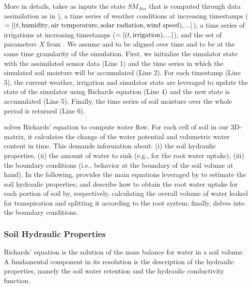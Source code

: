 More in details, \olab{} takes as inputs the state $SM_{Ass}$ that is computed through data assimilation as in ), a time series of weather conditions at increasing timestamps (\Wt$=[(t, \textup{humidity}, \textup{air temperature}, \textup{solar radiation}, \textup{wind speed}), ...]$), a time series of irrigations at increasing timestamps (\It$=[(t, \textup{irrigation}), ...]$), and the set of parameters $X$ from .
We assume \Wt{} and \It{} to be aligned over time and to be at the same time granularity of the simulation.
First, we initialize the simulator state with the assimilated sensor data (Line 1) and the time series in which the simulated soil moisture will be accumulated (Line 2).
For each timestamp (Line 3), the current weather, irrigation and  simulator state are leveraged to update the state of the simulator using Richards equation (Line 4) and the new state is accumulated (Line 5).
Finally, the time series of soil moisture over the whole period is returned (Line 6).

\olab{} solves Richards' equation \cite{richards1931capillary} to compute water flow.
For each cell of soil in our 3D-matrix, it calculates the change of the water potential and volumetric water content in time.
This demands information about: (i) the soil hydraulic properties, (ii) the amount of water to sink (e.g., for the root water uptake), (iii) the boundary conditions (i.e., behavior at the boundary of the soil volume at hand).
In the following,  provides the main equations leveraged by \olab{} to estimate the soil hydraulic properties;  and  describe how to obtain the root water uptake for each portion of soil by, respectively, calculating the overall volume of water leaked for transpiration and splitting it according to the root system; finally,  delves into the boundary conditions.   

\subsubsection{Soil Hydraulic Properties}
\label{orchard-sec:soil_properties}
Richards' equation is the solution of the mass balance for water in a soil volume.
A fundamental component in its resolution is the description of the hydraulic properties, namely the soil water retention and the hydraulic conductivity function. 

